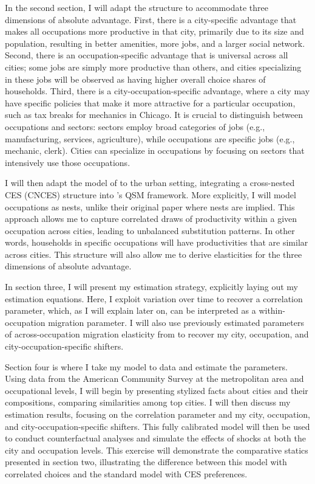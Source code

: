 \documentclass[10pt]{article}
\begin{document}
In the second section, I will adapt the \cite{ek} structure to accommodate three dimensions of absolute advantage. First, there is a city-specific advantage that makes all occupations more productive in that city, primarily due to its size and population, resulting in better amenities, more jobs, and a larger social network. Second, there is an occupation-specific advantage that is universal across all cities; some jobs are simply more productive than others, and cities specializing in these jobs will be observed as having higher overall choice shares of households. Third, there is a city-occupation-specific advantage, where a city may have specific policies that make it more attractive for a particular occupation, such as tax breaks for mechanics in Chicago. It is crucial to distinguish between occupations and sectors: sectors employ broad categories of jobs (e.g., manufacturing, services, agriculture), while occupations are specific jobs (e.g., mechanic, clerk). Cities can specialize in occupations by focusing on sectors that intensively use those occupations.

I will then adapt the model of \cite{lindandramondo} to the urban setting, integrating a cross-nested CES (CNCES) structure into \cite{redding2017}'s QSM framework. More explicitly, I will model occupations as nests, unlike their original paper where nests are implied. This approach allows me to capture correlated draws of productivity within a given occupation across cities, leading to unbalanced substitution patterns. In other words, households in specific occupations will have productivities that are similar across cities. This structure will also allow me to derive elasticities for the three dimensions of absolute advantage.

In section three, I will present my estimation strategy, explicitly laying out my estimation equations. Here, I exploit variation over time to recover a correlation parameter, which, as I will explain later on, can be interpreted as a within-occupation migration parameter. I will also use previously estimated parameters of across-occupation migration elasticity from \cite{redding} to recover my city, occupation, and city-occupation-specific shifters.

Section four is where I take my model to data and estimate the parameters. Using data from the American Community Survey at the metropolitan area and occupational levels, I will begin by presenting stylized facts about cities and their compositions, comparing similarities among top cities. I will then discuss my estimation results, focusing on the correlation parameter and my city, occupation, and city-occupation-specific shifters. This fully calibrated model will then be used to conduct counterfactual analyses and simulate the effects of shocks at both the city and occupation levels. This exercise will demonstrate the comparative statics presented in section two, illustrating the difference between this model with correlated choices and the standard model with CES preferences.
\end{document}

